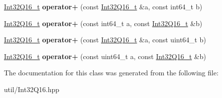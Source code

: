\begin{DoxyCompactItemize}
\item 
\hypertarget{class_int32_q16__t_ae5f02e220b35cbf5e327836c0576b97f}{}\hyperlink{class_int32_q16__t}{Int32\+Q16\+\_\+t} {\bfseries operator+} (const \hyperlink{class_int32_q16__t}{Int32\+Q16\+\_\+t} \&a, const int64\+\_\+t b)\label{class_int32_q16__t_ae5f02e220b35cbf5e327836c0576b97f}

\item 
\hypertarget{class_int32_q16__t_abe47059fd2f520fc1d826e771e17e00e}{}\hyperlink{class_int32_q16__t}{Int32\+Q16\+\_\+t} {\bfseries operator+} (const int64\+\_\+t a, const \hyperlink{class_int32_q16__t}{Int32\+Q16\+\_\+t} \&b)\label{class_int32_q16__t_abe47059fd2f520fc1d826e771e17e00e}

\item 
\hypertarget{class_int32_q16__t_a0ec52682c55185b738f828a73cd7386f}{}\hyperlink{class_int32_q16__t}{Int32\+Q16\+\_\+t} {\bfseries operator+} (const \hyperlink{class_int32_q16__t}{Int32\+Q16\+\_\+t} \&a, const uint64\+\_\+t b)\label{class_int32_q16__t_a0ec52682c55185b738f828a73cd7386f}

\item 
\hypertarget{class_int32_q16__t_a799f7e49a080cad48c49143302776cb1}{}\hyperlink{class_int32_q16__t}{Int32\+Q16\+\_\+t} {\bfseries operator+} (const uint64\+\_\+t a, const \hyperlink{class_int32_q16__t}{Int32\+Q16\+\_\+t} \&b)\label{class_int32_q16__t_a799f7e49a080cad48c49143302776cb1}

\end{DoxyCompactItemize}


The documentation for this class was generated from the following file\+:\begin{DoxyCompactItemize}
\item 
util/Int32\+Q16.\+hpp\end{DoxyCompactItemize}
